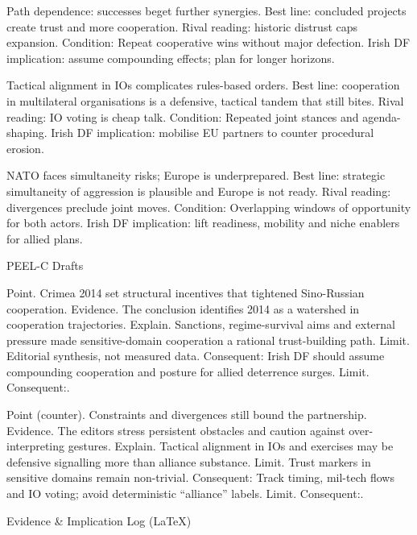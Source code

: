 Path dependence: successes beget further synergies.
Best line: concluded projects create trust and more cooperation.
Rival reading: historic distrust caps expansion.
Condition: Repeat cooperative wins without major defection.
Irish DF implication: assume compounding effects; plan for longer horizons.

Tactical alignment in IOs complicates rules-based orders.
Best line: cooperation in multilateral organisations is a defensive, tactical tandem that still bites.
Rival reading: IO voting is cheap talk.
Condition: Repeated joint stances and agenda-shaping.
Irish DF implication: mobilise EU partners to counter procedural erosion.

NATO faces simultaneity risks; Europe is underprepared.
Best line: strategic simultaneity of aggression is plausible and Europe is not ready.
Rival reading: divergences preclude joint moves.
Condition: Overlapping windows of opportunity for both actors.
Irish DF implication: lift readiness, mobility and niche enablers for allied plans.

PEEL-C Drafts

Point. Crimea 2014 set structural incentives that tightened Sino-Russian cooperation.
Evidence. The conclusion identifies 2014 as a watershed in cooperation trajectories.
Explain. Sanctions, regime-survival aims and external pressure made sensitive-domain cooperation a rational trust-building path.
Limit. Editorial synthesis, not measured data. Consequent: Irish DF should assume compounding cooperation and posture for allied deterrence surges. Limit. Consequent:.

Point (counter). Constraints and divergences still bound the partnership.
Evidence. The editors stress persistent obstacles and caution against over-interpreting gestures.
Explain. Tactical alignment in IOs and exercises may be defensive signalling more than alliance substance.
Limit. Trust markers in sensitive domains remain non-trivial. Consequent: Track timing, mil-tech flows and IO voting; avoid deterministic “alliance” labels. Limit. Consequent:.

Evidence & Implication Log (LaTeX)

